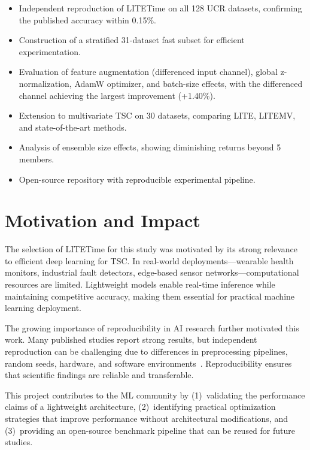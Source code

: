 \documentclass[conference]{IEEEtran}
\begin{document}
\begin{itemize}
    \item Independent reproduction of LITETime on all 128 UCR datasets, confirming the published accuracy within 0.15\%.
    \item Construction of a stratified 31-dataset fast subset for efficient experimentation.
    \item Evaluation of feature augmentation (differenced input channel), global z-normalization, AdamW optimizer, and batch-size effects, with the differenced channel achieving the largest improvement (+1.40\%).
    \item Extension to multivariate TSC on 30 datasets, comparing LITE, LITEMV, and state-of-the-art methods.
    \item Analysis of ensemble size effects, showing diminishing returns beyond 5 members.
    \item Open-source repository with reproducible experimental pipeline.
\end{itemize}

\section{Motivation and Impact}

The selection of LITETime for this study was motivated by its strong relevance to efficient deep learning for TSC. In real-world deployments---wearable health monitors, industrial fault detectors, edge-based sensor networks---computational resources are limited. Lightweight models enable real-time inference while maintaining competitive accuracy, making them essential for practical machine learning deployment.

The growing importance of reproducibility in AI research further motivated this work. Many published studies report strong results, but independent reproduction can be challenging due to differences in preprocessing pipelines, random seeds, hardware, and software environments~\cite{pineau2021reproducibility}. Reproducibility ensures that scientific findings are reliable and transferable.

This project contributes to the ML community by (1)~validating the performance claims of a lightweight architecture, (2)~identifying practical optimization strategies that improve performance without architectural modifications, and (3)~providing an open-source benchmark pipeline that can be reused for future studies.
\end{document}
